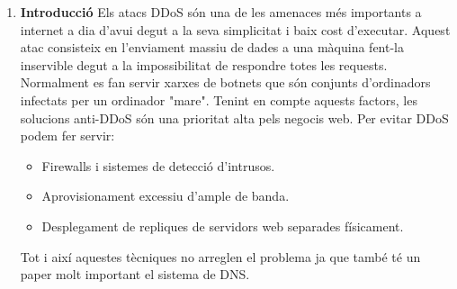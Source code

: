 \documentclass[a4paper, 10pt]{article}
\begin{document}
\begin{enumerate} 

\item \textbf{Introducció} \newline
Els atacs DDoS són una de les amenaces més importants a internet a dia d'avui degut a la seva simplicitat i baix cost d'executar. Aquest atac consisteix en l'enviament massiu de dades a una màquina fent-la inservible degut a la impossibilitat de respondre totes les requests. Normalment es fan servir xarxes de botnets que són conjunts d'ordinadors infectats per un ordinador "mare". 
Tenint en compte aquests factors, les solucions anti-DDoS són una prioritat alta pels negocis web. Per evitar DDoS podem fer servir:
\begin{itemize}
    \item Firewalls i sistemes de detecció d'intrusos.
    \item Aprovisionament excessiu d'ample de banda.
    \item Desplegament de repliques de servidors web separades físicament.
\end{itemize}
Tot i així aquestes tècniques no arreglen el problema ja que també té un paper molt important el sistema de DNS.


\end{enumerate}
\end{document}

